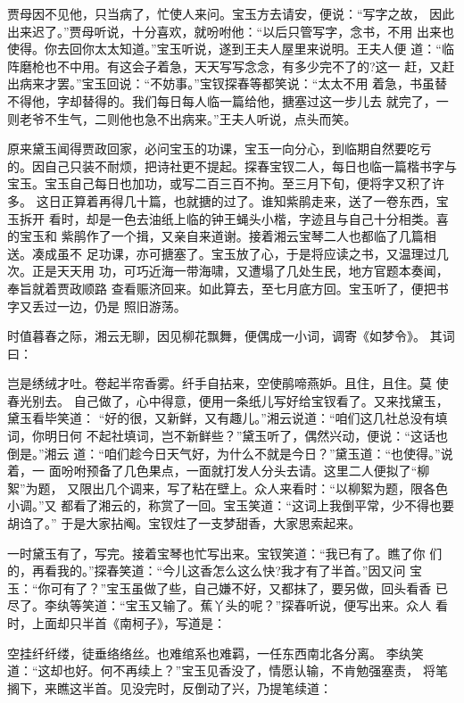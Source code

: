 贾母因不见他，只当病了，忙使人来问。宝玉方去请安，便说：“写字之故，
因此出来迟了。”贾母听说，十分喜欢，就吩咐他：“以后只管写字，念书，不用
出来也使得。你去回你太太知道。”宝玉听说，遂到王夫人屋里来说明。王夫人便
道：“临阵磨枪也不中用。有这会子着急，天天写写念念，有多少完不了的?这一
赶，又赶出病来才罢。”宝玉回说：“不妨事。”宝钗探春等都笑说：“太太不用
着急，书虽替不得他，字却替得的。我们每日每人临一篇给他，搪塞过这一步儿去
就完了，一则老爷不生气，二则他也急不出病来。”王夫人听说，点头而笑。

原来黛玉闻得贾政回家，必问宝玉的功课，宝玉一向分心，到临期自然要吃亏
的。因自己只装不耐烦，把诗社更不提起。探春宝钗二人，每日也临一篇楷书字与
宝玉。宝玉自己每日也加功，或写二百三百不拘。至三月下旬，便将字又积了许多。
这日正算着再得几十篇，也就搪的过了。谁知紫鹃走来，送了一卷东西，宝玉拆开
看时，却是一色去油纸上临的钟王蝇头小楷，字迹且与自己十分相类。喜的宝玉和
紫鹃作了一个揖，又亲自来道谢。接着湘云宝琴二人也都临了几篇相送。凑成虽不
足功课，亦可搪塞了。宝玉放了心，于是将应读之书，又温理过几次。正是天天用
功，可巧近海一带海啸，又遭塌了几处生民，地方官题本奏闻，奉旨就着贾政顺路
查看赈济回来。如此算去，至七月底方回。宝玉听了，便把书字又丢过一边，仍是
照旧游荡。

时值暮春之际，湘云无聊，因见柳花飘舞，便偶成一小词，调寄《如梦令》。
其词曰：

岂是绣绒才吐。卷起半帘香雾。纤手自拈来，空使鹃啼燕妒。且住，且住。莫
使春光别去。
自己做了，心中得意，便用一条纸儿写好给宝钗看了。又来找黛玉，黛玉看毕笑道：
“好的很，又新鲜，又有趣儿。”湘云说道：“咱们这几社总没有填词，你明日何
不起社填词，岂不新鲜些？”黛玉听了，偶然兴动，便说：“这话也倒是。”湘云
道：“咱们趁今日天气好，为什么不就是今日？”黛玉道：“也使得。”说着，一
面吩咐预备了几色果点，一面就打发人分头去请。这里二人便拟了“柳絮”为题，
又限出几个调来，写了粘在壁上。众人来看时：“以柳絮为题，限各色小调。”又
都看了湘云的，称赏了一回。宝玉笑道：“这词上我倒平常，少不得也要胡诌了。”
于是大家拈阄。宝钗炷了一支梦甜香，大家思索起来。

一时黛玉有了，写完。接着宝琴也忙写出来。宝钗笑道：“我已有了。瞧了你
们的，再看我的。”探春笑道：“今儿这香怎么这么快?我才有了半首。”因又问
宝玉：“你可有了？”宝玉虽做了些，自己嫌不好，又都抹了，要另做，回头看香
已尽了。李纨等笑道：“宝玉又输了。蕉丫头的呢？”探春听说，便写出来。众人
看时，上面却只半首《南柯子》，写道是：

空挂纤纤缕，徒垂络络丝。也难绾系也难羁，一任东西南北各分离。
李纨笑道：“这却也好。何不再续上？”宝玉见香没了，情愿认输，不肯勉强塞责，
将笔搁下，来瞧这半首。见没完时，反倒动了兴，乃提笔续道：


